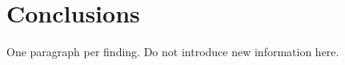 \documentclass[12pt,a4paper]{article}
\begin{document}

\section{Conclusions}
One paragraph per finding. Do not introduce new information here.



\end{document}
